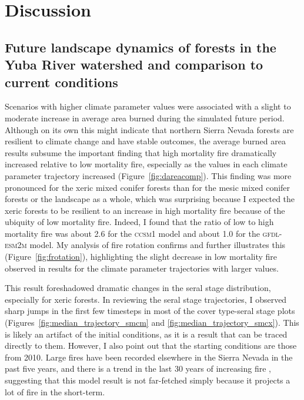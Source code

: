 \section{Discussion}

\subsection*{Future landscape dynamics of forests in the Yuba River watershed and comparison to current conditions}

Scenarios with higher climate parameter values were associated with a slight to moderate increase in average area burned during the simulated future period. Although on its own this might indicate that northern Sierra Nevada forests are resilient to climate change and have stable outcomes, the average burned area results subsume the important finding that high mortality fire dramatically increased relative to low mortality fire, especially as the values in each climate parameter trajectory increased (Figure~\ref{fig:dareacomp}). This finding was more pronounced for the xeric mixed conifer forests than for the mesic mixed conifer forests or the landscape as a whole, which was surprising because I expected the xeric forests to be resilient to an increase in high mortality fire because of the ubiquity of low mortality fire. Indeed, I found that the ratio of low to high mortality fire was about 2.6 for the \textsc{ccsm1} model and about 1.0 for the \textsc{gfdl-esm2m} model. My analysis of fire rotation confirms and further illustrates this (Figure~\ref{fig:frotation}), highlighting the slight decrease in low mortality fire observed in results for the climate parameter trajectories with larger values.

This result foreshadowed dramatic changes in the seral stage distribution, especially for xeric forests. In reviewing the seral stage trajectories, I observed sharp jumps in the first few timesteps in most of the cover type-seral stage plots (Figures~\ref{fig:median_trajectory_smcm} and \ref{fig:median_trajectory_smcx}). This is likely an artifact of the initial conditions, as it is a result that can be traced directly to them. However, I also point out that the starting conditions are those from 2010. Large fires have been recorded elsewhere in the Sierra Nevada in the past five years, and there is a trend in the last 30 years of increasing fire \citep{Miller2012}, suggesting that this model result is not far-fetched simply because it projects a lot of fire in the short-term.

